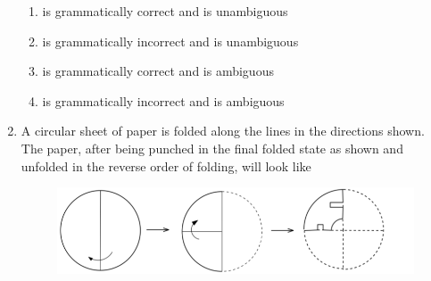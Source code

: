 \documentclass[journal,12pt,onecolumn]{IEEEtran}
\theoremstyle{remark}
\begin{document}
\begin{enumerate}
		\hfill{}
		
		\begin{enumerate}
			\item {} is grammatically correct and  is unambiguous
			\item {} is grammatically incorrect and  is unambiguous
			\item {} is grammatically correct and  is ambiguous
			\item {} is grammatically incorrect and  is ambiguous
		\end{enumerate}
		
		\item A circular sheet of paper is folded along the lines in the directions shown. The paper, after being punched in the final folded state as shown and unfolded in the reverse order of folding, will look like
		
		\hfill{}
		
		\begin{figure}[h!]
			\includegraphics[width = 0.5\columnwidth]{q4}
			\caption*{}
			\label{fig:q4}
		\end{figure}
		

\end{enumerate}
\end{document}
